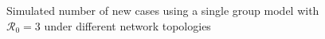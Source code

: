 \documentclass[12pt]{article}
\begin{document}
\begin{figure}[ht!]%
\begin{footnotesize}%
\caption
{Simulated number of new cases using a single group model with ${\mathcal
{R}_0}=3$ under different network topologies}%
\vspace{-0.2cm}%
\label{fig: network_compare}


\end{footnotesize}
\end{figure}
\end{document}
